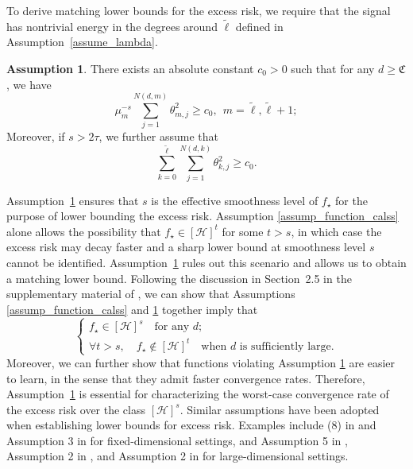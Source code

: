 \documentclass{article}
\theoremstyle{plain}
\theoremstyle{definition}
\newtheorem{assumption}{Assumption} %
\theoremstyle{remark}
\begin{document}
To derive matching lower bounds for the excess risk, we require that the signal has nontrivial energy in the degrees around $\tilde{\ell}$ defined in Assumption~\ref{assume_lambda}.


\begin{assumption}\label{assump_source condition_lower_bound}
There exists an absolute constant $c_{0} > 0$ such that for any $ d \geq \mathfrak{C}$, we have
\begin{equation*}
        \mu_{m}^{-s} \sum\limits_{j=1}^{N(d, m)}  \theta_{m,j}^{2} \ge c_{0}, ~~m=\tilde{\ell}, \tilde{\ell}+1;
   \end{equation*}
Moreover, if $s> 2\tau$, we further assume that
$$
\sum\limits_{k=0}^{\tilde{\ell}} \sum\limits_{j =1}^{N(d, k)}  \theta_{k, j}^{2} \ge c_{0}.
$$
\end{assumption}


Assumption~\ref{assump_source condition_lower_bound} ensures that $s$ is the effective smoothness level of $f_{\star}$ for the purpose of lower bounding the excess risk.
Assumption \ref{assump_function_calss} alone allows the possibility that $f_{\star}\in[\mathcal{H}]^{t}$ for some $t>s$, in which case the excess risk may decay faster and a sharp lower bound at smoothness level $s$ cannot be identified. 
Assumption~\ref{assump_source condition_lower_bound} rules out this scenario and allows us to obtain a matching lower bound.
Following the discussion in Section~2.5 in the supplementary material of \cite{zhang2024phase}, we can show that Assumptions \ref{assump_function_calss} and \ref{assump_source condition_lower_bound} together imply that
\begin{equation}\label{implication of assumption 2}
\left\{
\begin{gathered}
f_{\star} \in [\mathcal{H}]^{s} \quad \text{for any } d; \\
\forall t > s,\quad f_{\star} \notin [\mathcal{H}]^{t} \quad \text{when } d \text{ is sufficiently large}.
\end{gathered}
\right.
\end{equation}
Moreover, we can further show that functions violating Assumption \ref{assump_source condition_lower_bound} are easier to learn, in the sense that they admit faster convergence rates. Therefore, Assumption~\ref{assump_source condition_lower_bound} is essential for characterizing the worst-case convergence rate of the excess risk over the class $[\mathcal{H}]^{s}$.
Similar assumptions have been adopted when establishing lower bounds for excess risk. Examples include (8) in \cite{Cui2021GeneralizationER} and Assumption 3 in \cite{li2023asymptotic} for fixed-dimensional settings, and Assumption 5 in \cite{zhang2024optimal}, Assumption 2 in \cite{lu2024saturation}, and Assumption 2 in \cite{zhang2024phase} for large-dimensional settings. 
\end{document}
